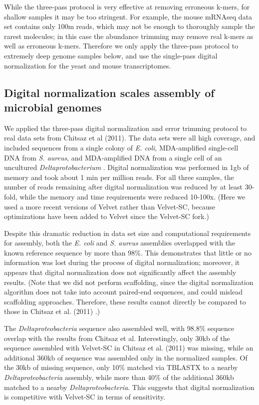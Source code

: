 \documentclass[10pt]{article}
\begin{document}
While the three-pass protocol is very effective at removing erroneous
k-mers, for shallow samples it may be too stringent.  For example, the
mouse mRNAseq data set contains only 100m reads, which may not be
enough to thoroughly sample the rarest molecules; in this case the
abundance trimming may remove real k-mers as well as erroneous k-mers.
Therefore we only apply the three-pass protocol to extremely deep
genome samples below, and use the single-pass digital normalization
for the yeast and mouse transcriptomes.

\subsection*{Digital normalization scales assembly of microbial genomes}

We applied the three-pass digital normalization and error trimming
protocol to real data sets from Chitsaz et al (2011).  The data sets
were all high coverage, and included sequences from a single colony of
{\em E. coli}, MDA-amplified single-cell DNA from {\em S. aureus}, and
MDA-amplified DNA from a single cell of an uncultured {\em
  Deltaprotobacterium} \cite{pubmed21926975}.  Digital normalization was performed in 1gb of
memory and took about 1 min per million reads.  For all three samples,
the number of reads remaining after digital normalization was reduced
by at least 30-fold, while the memory and time requirements were
reduced 10-100x.  (Here we used a more recent versions of Velvet
rather than Velvet-SC, because optimizations have been added to Velvet
since the Velvet-SC fork.)

Despite this dramatic reduction in data set size and computational
requirements for assembly, both the {\em E. coli} and {\em S. aureus}
assemblies overlapped with the known reference sequence by more than
98\%.  This demonstrates that little or no information was lost during
the process of digital normalization; moreover, it appears that
digital normalization does not significantly affect the assembly results.
(Note that we did not perform scaffolding, since the digital
normalization algorithm does not take into account paired-end
sequences, and could mislead scaffolding approaches.  Therefore, these
results cannot directly be compared to those in Chitsaz et al. (2011)
\cite{pubmedpubmed21926975}.)

The {\em Deltaproteobacteria} sequence also assembled well, with
98.8\% sequence overlap with the results from Chitsaz et al.
Interestingly, only 30kb of the sequence assembled with Velvet-SC in
Chitsaz et al. (2011) was missing, while an additional 360kb of
sequence was assembled only in the normalized samples.  Of the 30kb of
missing sequence, only 10\% matched via TBLASTX to a nearby {\em
  Deltaproteobacteria} assembly, while more than 40\% of the
additional 360kb matched to a nearby {\em Deltaproteobacteria}.  This
suggests that digital normalization is competitive
with Velvet-SC in terms of sensitivity.
\end{document}
